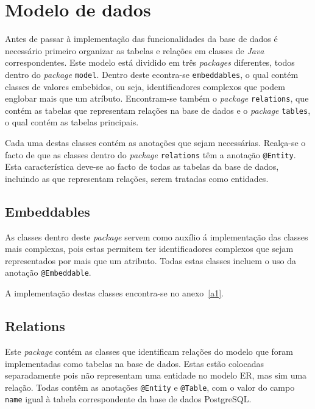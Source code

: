 %
%
\chapter{Modelo de dados} \label{cap2}

Antes de passar à implementação das funcionalidades da base de dados é necessário primeiro organizar as tabelas e relações em classes de \textit{Java} correspondentes.
Este modelo está dividido em três \textit{packages} diferentes, todos dentro do \textit{package} \texttt{model}. Dentro deste econtra-se \texttt{embeddables}, o qual
contém classes de valores embebidos, ou seja, identificadores complexos que podem englobar mais que um atríbuto. Encontram-se também o \textit{package} \texttt{relations},
que contém as tabelas que representam relações na base de dados e o \textit{package} \texttt{tables}, o qual contém as tabelas principais.

Cada uma destas classes contém as anotações que sejam necessárias. Realça-se o facto de que as classes dentro do \textit{package} \texttt{relations} têm a anotação
\texttt{@Entity}. Esta característica deve-se ao facto de todas as tabelas da base de dados, incluindo as que representam relações, serem tratadas como entidades.

%
%
\section{Embeddables} \label{sec21}

As classes dentro deste \textit{package} servem como auxílio á implementação das classes mais complexas, pois estas permitem ter identificadores complexos que sejam
representados por mais que um atributo. Todas estas classes incluem o uso da anotação \texttt{@Embeddable}.

A implementação destas classes encontra-se no anexo~\ref{a1}.

\section{Relations} \label{sec22}

Este \textit{package} contém as classes que identificam relações do modelo que foram implementadas como tabelas na base de dados. Estas estão colocadas separadamente
pois não representam uma entidade no modelo ER, mas sim uma relação. Todas contêm as anotações \texttt{@Entity} e \texttt{@Table}, com o valor do campo \texttt{name}
igual à tabela correspondente da base de dados PostgreSQL.

